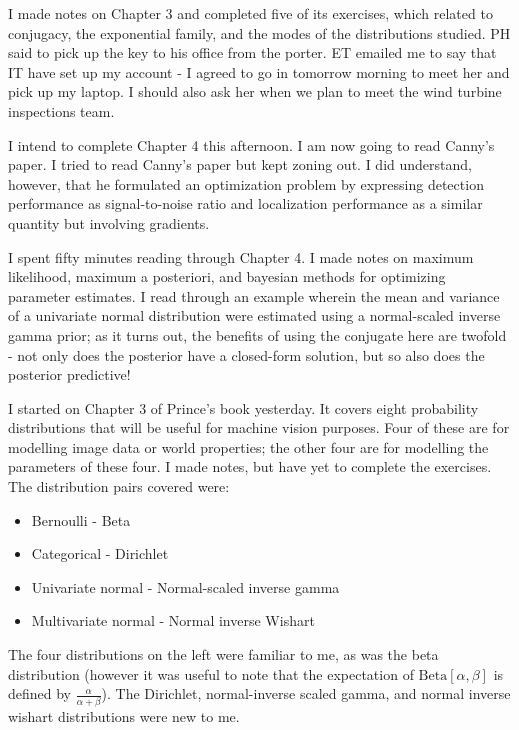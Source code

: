 \documentclass[idxtotoc,hyperref,openany]{labbook} %
\begin{document}
I made notes on Chapter 3 and completed five of its exercises, which related to conjugacy, the exponential family, and the modes of the distributions studied. PH said to pick up the key to his office from the porter. ET emailed me to say that IT have set up my account - I agreed to go in tomorrow morning to meet her and pick up my laptop. I should also ask her when we plan to meet the wind turbine inspections team.

I intend to complete Chapter 4 this afternoon. I am now going to read Canny's paper.
I tried to read Canny's paper but kept zoning out. I did understand, however, that he formulated an optimization problem by expressing detection performance as signal-to-noise ratio and localization performance as a similar quantity but involving gradients.

I spent fifty minutes reading through Chapter 4. I made notes on maximum likelihood, maximum a posteriori, and bayesian methods for optimizing parameter estimates. I read through an example wherein the mean and variance of a univariate normal distribution were estimated using a normal-scaled inverse gamma prior; as it turns out, the benefits of using the conjugate here are twofold - not only does the posterior have a closed-form solution, but so also does the posterior predictive!


I started on Chapter 3 of Prince's book yesterday. It covers eight probability distributions that will be useful for machine vision purposes. Four of these are for modelling image data or world properties; the other four are for modelling the parameters of these four. I made notes, but have yet to complete the exercises. The distribution pairs covered were:
\begin{itemize}
	\item Bernoulli - Beta
	\item Categorical - Dirichlet
	\item Univariate normal - Normal-scaled inverse gamma
	\item Multivariate normal - Normal inverse Wishart
\end{itemize}
The four distributions on the left were familiar to me, as was the beta distribution (however it was useful to note that the expectation of $\text{Beta}[\alpha, \beta]$ is defined by $\frac{\alpha}{\alpha + \beta}$). The Dirichlet, normal-inverse scaled gamma, and normal inverse wishart distributions were new to me. 
\end{document}
